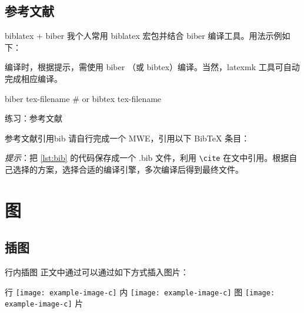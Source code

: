 \documentclass[final]{ctexbeamer}
\begin{document}
\subsection{参考文献}
\begin{frame}[fragile]{biblatex + biber}
我个人常用 biblatex 宏包并结合 biber 编译工具。用法示例如下：
\begin{texlst}
\usepackage[]{biblatex}


\printbibliography[]
\end{texlst}
编译时，根据提示，需使用 biber （或 bibtex）编译。当然，latexmk 工具可自动完成相应编译。
\begin{bashlst}
biber tex-filename
# or bibtex tex-filename
\end{bashlst}
\end{frame}

\begin{frame}[fragile]{练习：参考文献}
\begin{Ex}{参考文献引用}{bib}
请自行完成一个 MWE，引用以下 BibTeX 条目：

\myhrule

\emph{提示}：把 \ref{lst:bib} 的代码保存成一个 .bib 文件，利用 \verb+\cite+ 在文中引用。根据自己选择的方案，选择合适的编译引擎，多次编译后得到最终文件。
\end{Ex}
\end{frame}



\section{图}
% 
\subsection{插图}
\begin{frame}[fragile]{行内插图}
正文中通过可以通过如下方式插入图片：
\begin{vertlst}
行 \texttt{[image: example-image-c]}
内 \texttt{[image: example-image-c]}
图 \texttt{[image: example-image-c]}
片 
\end{vertlst}
\end{frame}
\end{document}
